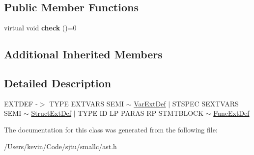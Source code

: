 \subsection*{Public Member Functions}
\begin{DoxyCompactItemize}
\item 
\mbox{\label{class_ext_def_a1b764d99bfc974bd261d7f0b6e141132}} 
virtual void {\bfseries check} ()=0
\end{DoxyCompactItemize}
\subsection*{Additional Inherited Members}


\subsection{Detailed Description}
E\+X\+T\+D\+EF -\/$>$ T\+Y\+PE E\+X\+T\+V\+A\+RS S\+E\+MI $\sim$ \hyperlink{class_var_ext_def}{Var\+Ext\+Def} $\vert$ S\+T\+S\+P\+EC S\+E\+X\+T\+V\+A\+RS S\+E\+MI $\sim$ \hyperlink{class_struct_ext_def}{Struct\+Ext\+Def} $\vert$ T\+Y\+PE ID LP P\+A\+R\+AS RP S\+T\+M\+T\+B\+L\+O\+CK $\sim$ \hyperlink{class_func_ext_def}{Func\+Ext\+Def} 

The documentation for this class was generated from the following file\+:\begin{DoxyCompactItemize}
\item 
/\+Users/kevin/\+Code/sjtu/smallc/ast.\+h\end{DoxyCompactItemize}
